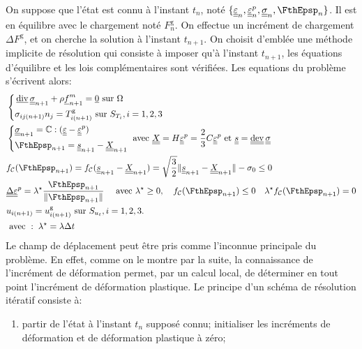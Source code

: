 \documentclass[10pt]{book}
\begin{document}
\begin{appendices}
On suppose que l'état est connu à l'instant $t_{n}$, noté $\{\DefoHPP_{n},\DefoHPP_{n}^{p},\SC_{n},\FthEpsp_{n}\}$. Il est en équilibre avec le chargement noté $F_{n}^{\mathrm{g}}$. On effectue un incrément de chargement $\Delta F^{\mathrm{g}}$, et on cherche la solution à l'instant $t_{n+1}$. On choisit d'emblée une méthode implicite de résolution qui consiste à imposer qu'à l'instant $t_{n+1}$, les équations d'équilibre et les lois complémentaires sont vérifiées. Les equations du problème s'écrivent alors:
\begin{align}
&\left\{\begin{aligned}
&\vdiv\SC_{n+1}+\rho\FMass_{n+1}=\vec{0} \sur \Omega\\
&\sigma_{ij(n+1)}n_{j}=T_{i(n+1)}^{\mathrm{g}}\sur S_{T_{i}}, i=1, 2, 3\\	
\end{aligned}\right.\\\label{eq:loi_compo_increm_cin_lin}
&\left\{\begin{aligned}
&\SC_{n+1}=\RigiLin:(\DefoHPP-\EpsP)\\
&\FthEpsp_{n+1}=\devia_{n+1}-\CentreConv_{n+1}\\
\end{aligned} \right. \avec\CentreConv=H \DefoHPP^{p}=\frac{2}{3}C\EpsP\et \devia=\dev\SC\\\label{eq:Fonction_charge_incre}
&\FChargeConvexe(\FthEpsp_{n+1})=\FChargeConvexe(\devia_{n+1}-\CentreConv_{n+1})=\sqrt{\frac{3}{2}}\Vert \devia_{n+1}-\CentreConv_{n+1}\Vert-\sigma_{0}\leq0\\\label{eq:Ecoulement_incre}
&\DeltaDefoHPP^{p}=\lambda^{\star}\frac{\FthEpsp_{n+1}}{\Vert \FthEpsp_{n+1}\Vert} \quad \avec \lambda^{\star}\geq 0, \quad \FChargeConvexe(\FthEpsp_{n+1})\leq 0 \quad \lambda^{\star}\FChargeConvexe(\FthEpsp_{n+1})=0\\
&u_{i(n+1)}=u_{i(n+1)}^{\mathrm{g}} \sur S_{u_{t}}, i=1, 2, 3.\\
&\avec: \; \lambda^{\star}=\lambda\Delta t
\end{align}
Le champ de déplacement peut être pris comme l'inconnue principale du problème. En effet, comme on le montre par la suite, la connaissance de l'incrément de déformation permet, par un calcul local, de déterminer en tout point l'incrément de déformation plastique. Le principe d'un schéma de résolution itératif consiste à:
\begin{enumerate}
\item partir de l'état à l'instant $t_{n}$ supposé connu; initialiser les incréments de déformation et de déformation plastique à zéro;

\end{enumerate}
\end{appendices}
\end{document}
